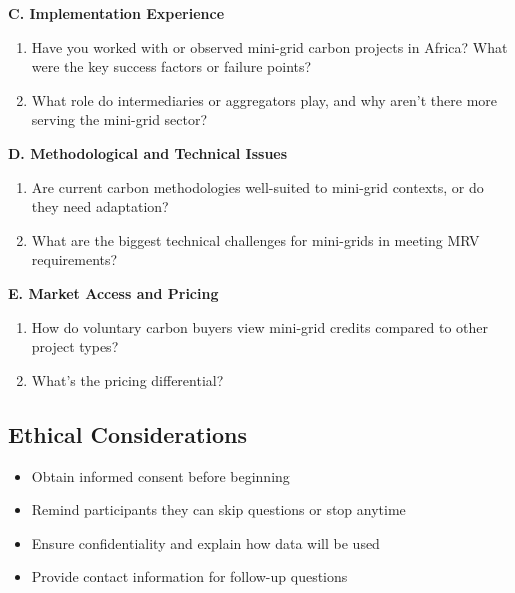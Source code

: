 \textbf{C. Implementation Experience}
\begin{enumerate}[resume]
	\item Have you worked with or observed mini-grid carbon projects in Africa? What were the key success factors or failure points?
	\item What role do intermediaries or aggregators play, and why aren't there more serving the mini-grid sector?
\end{enumerate}

\textbf{D. Methodological and Technical Issues}
\begin{enumerate}[resume]
	\item Are current carbon methodologies well-suited to mini-grid contexts, or do they need adaptation?
	\item What are the biggest technical challenges for mini-grids in meeting MRV requirements?
\end{enumerate}

\textbf{E. Market Access and Pricing}
\begin{enumerate}[resume]
	\item How do voluntary carbon buyers view mini-grid credits compared to other project types?
	\item What's the pricing differential?
\end{enumerate}

\subsection{Ethical Considerations}
\begin{itemize}
	\item Obtain informed consent before beginning
	\item Remind participants they can skip questions or stop anytime
	\item Ensure confidentiality and explain how data will be used
	\item Provide contact information for follow-up questions
\end{itemize}